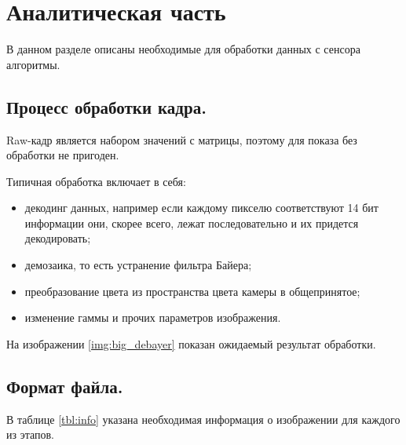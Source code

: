 \chapter{Аналитическая часть}

В данном разделе описаны необходимые для обработки данных с сенсора алгоритмы.

\section{Процесс обработки кадра.}

Raw-кадр является набором значений с матрицы, поэтому для показа без обработки не пригоден.

Типичная обработка включает в себя:
\begin{itemize}
	\item декодинг данных, например если каждому пикселю соответствуют 14 бит информации они, скорее всего, лежат последовательно и их придется декодировать;
	\item демозаика, то есть устранение фильтра Байера;
	\item преобразование цвета из пространства цвета камеры в общепринятое;
	\item изменение гаммы и прочих параметров изображения.
\end{itemize}

На изображении \ref{img:big_debayer} показан ожидаемый результат обработки.


\section{Формат файла.}

В таблице \ref{tbl:info} указана необходимая информация о изображении для каждого из этапов.

\begin{table}[h]
	\begin{center}
		\caption{Используемая информация о изображении.}
		\label{tbl:info}
	\end{center}
\end{table}


